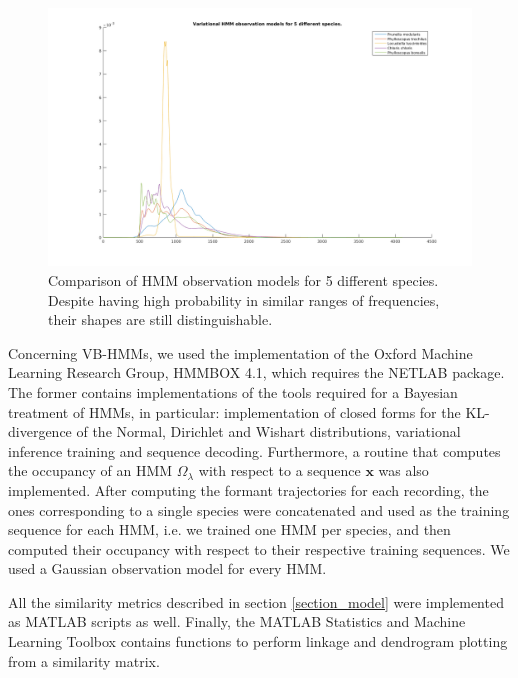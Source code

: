 \documentclass[pdftex,11pt,a4paper]{article}
\theoremstyle{definition}
\theoremstyle{remark}
\newcommand*{\V}[1]{\mathbf{#1}}%
\begin{document}
\begin{figure}[t]
\centering
\includegraphics[width=\textwidth]{images/gmm_plots}
\caption{Comparison of HMM observation models for 5 different species. Despite having high probability in similar ranges of frequencies, their shapes are still distinguishable. }
\label{fig_kdespecies}
\end{figure}
\par Concerning VB-HMMs, we used the implementation of the Oxford Machine Learning Research Group, HMMBOX 4.1, which requires the NETLAB package. The former contains implementations of the tools required for a Bayesian treatment of HMMs, in particular: implementation of closed forms for the KL-divergence of the Normal, Dirichlet and Wishart distributions, variational inference training and sequence decoding. Furthermore, a routine that computes the occupancy of an HMM $\Omega_\lambda$ with respect to a sequence $\V{x}$ was also implemented. After computing the formant trajectories for each recording, the ones corresponding to a single species were concatenated and used as the training sequence for each HMM, i.e. we trained one HMM per species, and then computed their occupancy with respect to their respective training sequences. We used a Gaussian observation model for every HMM.
\par All the similarity metrics described in section \ref{section_model} were implemented as MATLAB scripts as well. Finally, the MATLAB Statistics and Machine Learning Toolbox contains functions to perform linkage and dendrogram plotting from a similarity matrix.
\end{document}
